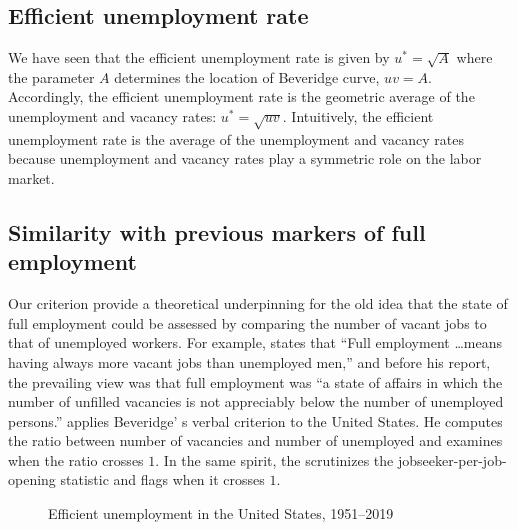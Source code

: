 \documentclass[letterpaper,12pt,leqno]{article}
\newcommand{\pdf}{../../figures/xsquareroot_202206.pdf}
\begin{document}
\subsection{Efficient unemployment rate}

We have seen that the efficient unemployment rate is given by $u^* = \sqrt{A}$ where the parameter $A$ determines the location of Beveridge curve, $uv = A$. Accordingly, the efficient unemployment rate is the geometric average of the unemployment and vacancy rates: $u^* = \sqrt{uv}$. Intuitively, the efficient unemployment rate is the average of the unemployment and vacancy rates because unemployment and vacancy rates play a symmetric role on the labor market.

\subsection{Similarity with previous markers of full employment}

Our criterion provide a theoretical underpinning for the old idea that the state of full employment could be assessed by comparing the number of vacant jobs to that of unemployed workers. For example,  \citet[p. 18]{B44} states that ``Full employment \dots means having always more vacant jobs than unemployed men,'' and before his report, the prevailing view was that full employment was ``a state of affairs in which the number of unfilled vacancies is not appreciably below the number of unemployed persons.'' \citet[p. 39 and chart 5]{R57} applies Beveridge' s verbal criterion to the United States. He computes the ratio between number of vacancies and number of unemployed and examines when the ratio crosses $1$. In the same spirit, the \citet{BLS22} scrutinizes the jobseeker-per-job-opening statistic and flags when it crosses $1$.

\begin{figure}[t]
\hfill
{}
\caption{Efficient unemployment in the United States, 1951--2019}
\label{f:squareroot1951}\end{figure}
\end{document}

